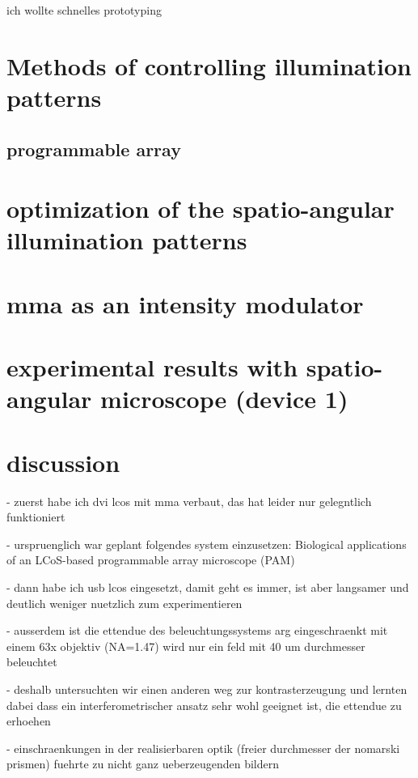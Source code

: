 \documentclass[oneside,a4paper,12pt,BCOR20mm,DIV14]{scrbook} %
\begin{document}
ich wollte schnelles prototyping




\chapter{Methods of controlling illumination patterns}
\label{sec:illum-patterns}
\section{programmable array}
\cite{Jovin2011}



\chapter{optimization of the spatio-angular illumination patterns}
\label{sec:optimization}
\chapter{mma as an intensity modulator}
\label{sec:mma}

\chapter{experimental results with spatio-angular microscope (device 1)}
\label{sec:results}
\chapter{discussion}
\label{sec:discussion}
- zuerst habe ich dvi lcos mit mma verbaut, das hat leider nur
  gelegntlich funktioniert

- urspruenglich war geplant folgendes system einzusetzen: Biological
  applications of an LCoS-based programmable array microscope (PAM)

- dann habe ich usb lcos eingesetzt, damit geht es immer, ist aber
  langsamer und deutlich weniger nuetzlich zum experimentieren

- ausserdem ist die ettendue des beleuchtungssystems arg
  eingeschraenkt mit einem 63x objektiv (NA=1.47) wird nur ein feld
  mit 40 um durchmesser beleuchtet

- deshalb untersuchten wir einen anderen weg zur kontrasterzeugung und
  lernten dabei dass ein interferometrischer ansatz sehr wohl geeignet
  ist, die ettendue zu erhoehen

  - einschraenkungen in der realisierbaren optik (freier durchmesser
    der nomarski prismen) fuehrte zu nicht ganz ueberzeugenden bildern
\end{document}
